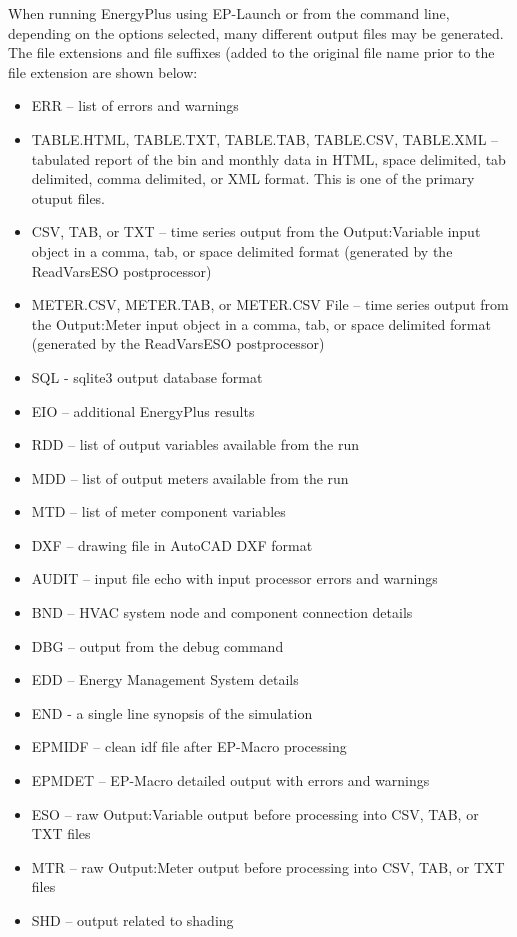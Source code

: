 When running EnergyPlus using EP-Launch or from the command line,
depending on the options selected, many different output files may
be generated. The file extensions and file suffixes (added to the
original file name prior to the file extension are shown below:
\begin{itemize}
\item ERR -- list of errors and warnings
\item TABLE.HTML, TABLE.TXT, TABLE.TAB, TABLE.CSV, TABLE.XML -- tabulated
report of the bin and monthly data in HTML, space delimited, tab delimited,
comma delimited, or XML format. This is one of the primary otuput
files.
\item CSV, TAB, or TXT -- time series output from the Output:Variable input
object in a comma, tab, or space delimited format (generated by the
ReadVarsESO postprocessor) 
\item METER.CSV, METER.TAB, or METER.CSV File -- time series output from
the Output:Meter input object in a comma, tab, or space delimited
format (generated by the ReadVarsESO postprocessor)
\item SQL - sqlite3 output database format
\item EIO -- additional EnergyPlus results
\item RDD -- list of output variables available from the run
\item MDD -- list of output meters available from the run 
\item MTD -- list of meter component variables
\item DXF -- drawing file in AutoCAD DXF format
\item AUDIT -- input file echo with input processor errors and warnings
\item BND -- HVAC system node and component connection details
\item DBG -- output from the debug command
\item EDD -- Energy Management System details
\item END - a single line synopsis of the simulation
\item EPMIDF -- clean idf file after EP-Macro processing
\item EPMDET -- EP-Macro detailed output with errors and warnings
\item ESO -- raw Output:Variable output before processing into CSV, TAB,
or TXT files
\item MTR -- raw Output:Meter output before processing into CSV, TAB, or
TXT files
\item SHD -- output related to shading

\end{itemize}
